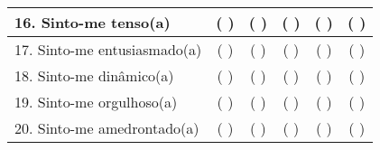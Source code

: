 \begin{table}[ht]
\begin{longtable}{|p{274pt}|l|l|l|l|l|}
\hline
16. Sinto-me tenso(a) & \multicolumn{1}{c|}{(   )} & \multicolumn{1}{c|}{(   )} & \multicolumn{1}{c|}{(   )} & \multicolumn{1}{c|}{(   )} & \multicolumn{1}{c|}{(   )} \\ 
\hline
17. Sinto-me entusiasmado(a) & \multicolumn{1}{c|}{(   )} & \multicolumn{1}{c|}{(   )} & \multicolumn{1}{c|}{(   )} & \multicolumn{1}{c|}{(   )} & \multicolumn{1}{c|}{(   )} \\ 
\hline
18. Sinto-me dinâmico(a) & \multicolumn{1}{c|}{(   )} & \multicolumn{1}{c|}{(   )} & \multicolumn{1}{c|}{(   )} & \multicolumn{1}{c|}{(   )} & \multicolumn{1}{c|}{(   )} \\ 
\hline
19. Sinto-me orgulhoso(a) & \multicolumn{1}{c|}{(   )} & \multicolumn{1}{c|}{(   )} & \multicolumn{1}{c|}{(   )} & \multicolumn{1}{c|}{(   )} & \multicolumn{1}{c|}{(   )} \\ 
\hline
20. Sinto-me amedrontado(a) & \multicolumn{1}{c|}{(   )} & \multicolumn{1}{c|}{(   )} & \multicolumn{1}{c|}{(   )} & \multicolumn{1}{c|}{(   )} & \multicolumn{1}{c|}{(   )} \\ 
\hline
\end{longtable}
\end{table}






























